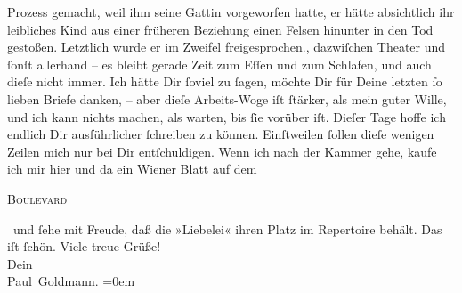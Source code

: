 \begin{ledgroupsized}[t]{13cm}
{{{                  Prozess gemacht, weil ihm seine Gattin vorgeworfen hatte, er hätte absichtlich ihr
                  leibliches Kind aus einer
                  früheren Beziehung einen Felsen hinunter in den Tod gestoßen. Letztlich wurde er
                  im Zweifel freigesprochen.}}}\label{K_L02754-3h}, dazwiſchen Theater und ſonſt allerhand – es
               bleibt gerade Zeit zum Eſſen und zum Schlafen, und auch dieſe nicht immer. Ich hätte Dir ſoviel zu ſagen, möchte Dir für Deine
               letzten ſo lieben Briefe danken, – aber dieſe Arbeits-Woge iſt ſtärker, als mein
               guter Wille, und ich kann nichts machen, als warten, bis ſie vorüber iſt. Dieſer Tage
               hoffe ich endlich Dir ausführlicher ſchreiben zu können. Einſtweilen ſollen dieſe
               wenigen Zeilen mich nur bei Dir entſchuldigen. Wenn ich nach der Kammer gehe, kaufe ich mir hier und da ein
                  Wiener Blatt auf dem \begin{otherlanguage}{french}\textsc{Boulevard}\end{otherlanguage} und ſehe mit Freude, daß die »Liebelei«  ihren {\pb}Platz im Repertoire behält. \strikeout{\textcolor{gray}{×}\-\textcolor{gray}{×}\-\textcolor{gray}{×}\-\textcolor{gray}{×}\-\textcolor{gray}{×}} Das iſt ſchön.\pend
           \pstart
           Viele treue Grüße! {\\[\baselineskip]}Dein {\\[\baselineskip]}\spacefill\mbox{Paul Goldmann.}\pend
           \leftskip=0em{}
         
         \endnumbering{}\end{ledgroupsized}  \newcommand{\dateiname}{L02754}\newcommand{\titel}{Paul Goldmann an Arthur Schnitzler, 6. 11. [1895]}\newcommand{\editorInnen}{Martin Anton Müller und Laura Untner}
      